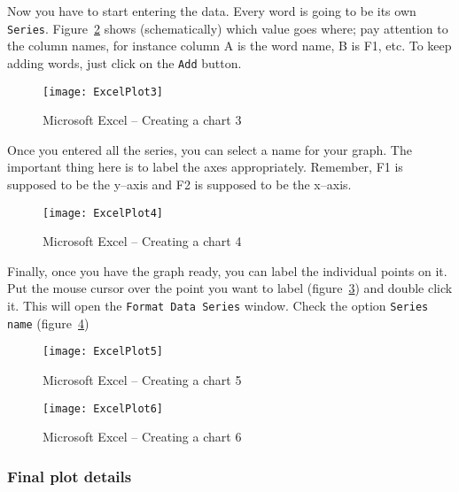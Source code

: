 \documentclass{article}
\newcommand{\soft}[1]{\textsf{#1}}
\newcommand{\softmenu}[1]{\texttt{#1}}
\newcommand{\MSExcel}{\soft{Microsoft\texttrademark{} Excel}}
\begin{document}
Now you have to start entering the data. Every word is going to be its own \softmenu{Series}. Figure~\ref{step3plot} shows (schematically) which value goes where; pay attention to the column names, for instance column A is the word name, B is F1, etc. To keep adding words, just click on the \softmenu{Add} button.

\begin{figure}[!tbp]
\caption{\MSExcel{} -- Creating a chart 3}
\label{step3plot}
	\begin{center}
		\texttt{[image: ExcelPlot3]}
	\end{center}
\end{figure}

Once you entered all the series, you can select a name for your graph. The important thing here is to label the axes appropriately. Remember, F1 is supposed to be the y--axis and F2 is supposed to be the x--axis.

\begin{figure}[!tbp]
\caption{\MSExcel{} -- Creating a chart 4}
\label{step3plot}
	\begin{center}
		\texttt{[image: ExcelPlot4]}
	\end{center}
\end{figure}

Finally, once you have the graph ready, you can label the individual points on it. Put the mouse cursor over the point you want to label (figure~\ref{step4plot}) and double click it. This will open the \softmenu{Format Data Series} window. Check the option \softmenu{Series name} (figure~\ref{step5plot})

\begin{figure}[!tbp]
\caption{\MSExcel{} -- Creating a chart 5}
\label{step4plot}
	\begin{center}
		\texttt{[image: ExcelPlot5]}
	\end{center}
\end{figure}

\begin{figure}[!tbp]
\caption{\MSExcel{} -- Creating a chart 6}
\label{step5plot}
	\begin{center}
		\texttt{[image: ExcelPlot6]}
	\end{center}
\end{figure}

\subsubsection{Final plot details}
\end{document}
